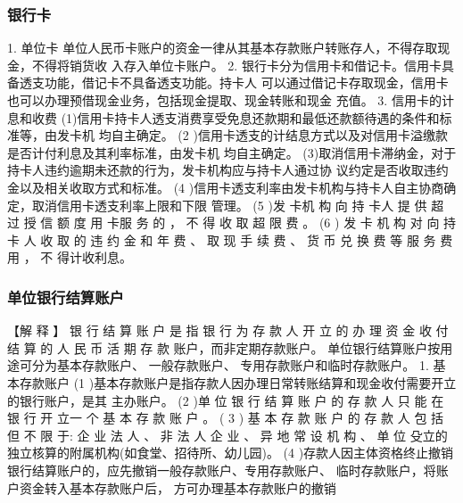 \documentclass[UTF8,12pt]{ctexart}
\numberwithin{equation}{section} %
\numberwithin{figure}{section}
\numberwithin{table}{section}
\begin{document}
	\subsubsection{银行卡} 
	1. 单位卡
	单位人民币卡账户的资金一律从其基本存款账户转账存人，不得存取现金，不得将销货收
	入存入单位卡账户。
	2. 银行卡分为信用卡和借记卡。信用卡具备透支功能，借记卡不具备透支功能。持卡人
	可以通过借记卡存取现金，信用卡也可以办理预借现金业务，包括现金提取、现金转账和现金
	充值。
	3. 信用卡的计息和收费
	(1)信用卡持卡人透支消费享受免息还款期和最低还款额待遇的条件和标准等，由发卡机
	均自主确定。
	(2 )信用卡透支的计结息方式以及对信用卡溢缴款是否计付利息及其利率标准，由发卡机
	均自主确定。
	(3)取消信用卡滞纳金，对于持卡人违约逾期未还款的行为，发卡机构应与持卡人通过协
	议约定是否收取违约金以及相关收取方式和标准。
	(4 )信用卡透支利率由发卡机构与持卡人自主协商确定，取消信用卡透支利率上限和下限
	管理。
	(5 )发 卡机 构 向 持 卡人 提 供 超 过 授 信 额 度 用 卡服 务 的 ， 不 得 收 取 超 限 费 。
	(6 ) 发 卡 机 构 对 向 持 卡 人 收 取 的 违 约 金 和 年 费 、 取 现 手 续 费 、 货 币 兑 换 费 等 服 务 费 用 ， 不
	得计收利息。
	
	\subsubsection{单位银行结算账户} 
	【解 释 】 银 行 结 算 账 户 是 指 银 行 为 存 款 人 开 立 的 办 理 资 金 收 付 结 算 的 人 民 币 活 期 存 款
	账户，而非定期存款账户。 单位银行结算账户按用途可分为基本存款账户、 一般存款账户、
	专用存款账户和临时存款账户。
	1. 基本存款账户
	(1 )基本存款账户是指存款人因办理日常转账结算和现金收付需要开立的银行账户，是其
	主办账户。
	(2 )单 位 银 行 结 算 账 户 的 存 款 人 只 能 在 银 行 开 立一 个 基 本 存 款 账 户 。
	( 3 ) 基 本 存 款 账 户 的 存 款 人 包 括 但 不 限 于: 企 业 法 人 、 非 法 人 企 业 、 异 地 常 设 机 构 、 单 位
	殳立的独立核算的附属机构(如食堂、招待所、幼儿园)。
	(4 )存款人因主体资格终止撤销银行结算账户的，应先撤销一般存款账户、专用存款账户、
	临时存款账户，将账户资金转入基本存款账户后， 方可办理基本存款账户的撤销
	
\end{document}
